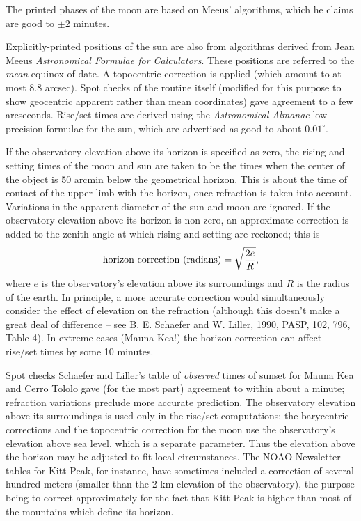 The printed phases of the moon are based on Meeus' algorithms, which he 
claims are good to $\pm 2$ minutes.
\par
Explicitly-printed positions of the sun are also from algorithms derived 
from Jean Meeus {\it Astronomical Formulae for Calculators}.  These positions 
are referred to the {\it mean} equinox of date.  A topocentric correction 
is applied (which amount to at most 8.8 arcsec).  Spot checks of the routine 
itself (modified for this purpose to show geocentric apparent rather than 
mean coordinates) gave agreement to a few arcseconds.  Rise/set times are 
derived using the {\it Astronomical Almanac} low-precision formulae for 
the sun, which are advertised as good to about $0.01^{\circ}$.
\par
If the observatory elevation above its horizon is specified as zero, the 
rising and setting times of the moon and sun are taken to be the times when
the center of the object is 50 arcmin below the geometrical horizon.  This 
is about the time of contact of the upper limb with the horizon, once 
refraction is taken into account.  Variations in the apparent diameter of 
the sun and moon are ignored.  If the observatory elevation above its 
horizon is non-zero, an approximate correction is added to the zenith 
angle at which rising and setting are reckoned; this is 
$$\hbox{horizon correction (radians)} = \sqrt{2 e \over R},$$
where $e$ is the observatory's elevation above its surroundings and $R$ 
is the radius of the earth.  In principle, a more accurate correction 
would simultaneously consider the effect of elevation on the refraction 
(although this doesn't make a great deal of difference -- see B. E. Schaefer 
and W. Liller, 1990, PASP, 102, 796, Table 4). In extreme cases (Mauna Kea!) 
the horizon correction can affect rise/set times by some 10 minutes.

Spot checks Schaefer and Liller's table of {\it observed} times of sunset 
for Mauna Kea and Cerro Tololo gave (for the most part) agreement to within 
about a minute; refraction variations preclude more accurate prediction.  
The observatory elevation above its surroundings is used only in the rise/set 
computations; the barycentric corrections and the topocentric correction 
for the moon use the observatory's elevation above sea level, which is a 
separate parameter.  Thus the elevation above the horizon may be adjusted 
to fit local circumstances.  The NOAO Newsletter tables for Kitt Peak, for 
instance, have sometimes included a correction of several hundred meters 
(smaller than the 2 km elevation of the observatory), the purpose being to 
correct approximately for the fact that Kitt Peak is higher than most of 
the mountains which define its horizon.

